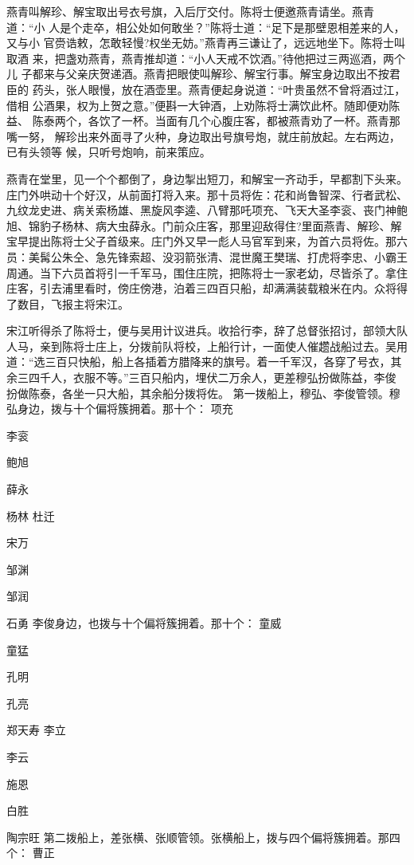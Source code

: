 燕青叫解珍、解宝取出号衣号旗，入后厅交付。陈将士便邀燕青请坐。燕青道：“小
人是个走卒，相公处如何敢坐？”陈将士道：“足下是那壁恩相差来的人，又与小
官赍诰敕，怎敢轻慢?权坐无妨。”燕青再三谦让了，远远地坐下。陈将士叫取酒
来，把盏劝燕青，燕青推却道：“小人天戒不饮酒。”待他把过三两巡酒，两个儿
子都来与父亲庆贺递酒。燕青把眼使叫解珍、解宝行事。解宝身边取出不按君臣的
药头，张人眼慢，放在酒壶里。燕青便起身说道：“叶贵虽然不曾将酒过江，借相
公酒果，权为上贺之意。”便斟一大钟酒，上劝陈将士满饮此杯。随即便劝陈益、
陈泰两个，各饮了一杯。当面有几个心腹庄客，都被燕青劝了一杯。燕青那嘴一努，
解珍出来外面寻了火种，身边取出号旗号炮，就庄前放起。左右两边，已有头领等
候，只听号炮响，前来策应。

燕青在堂里，见一个个都倒了，身边掣出短刀，和解宝一齐动手，早都割下头来。
庄门外哄动十个好汉，从前面打将入来。那十员将佐：花和尚鲁智深、行者武松、
九纹龙史进、病关索杨雄、黑旋风李逵、八臂那吒项充、飞天大圣李衮、丧门神鲍
旭、锦豹子杨林、病大虫薛永。门前众庄客，那里迎敌得住?里面燕青、解珍、解
宝早提出陈将士父子首级来。庄门外又早一彪人马官军到来，为首六员将佐。那六
员：美髯公朱仝、急先锋索超、没羽箭张清、混世魔王樊瑞、打虎将李忠、小霸王
周通。当下六员首将引一千军马，围住庄院，把陈将士一家老幼，尽皆杀了。拿住
庄客，引去浦里看时，傍庄傍港，泊着三四百只船，却满满装载粮米在内。众将得
了数目，飞报主将宋江。

宋江听得杀了陈将士，便与吴用计议进兵。收拾行李，辞了总督张招讨，部领大队
人马，亲到陈将士庄上，分拨前队将校，上船行计，一面使人催趱战船过去。吴用
道：“选三百只快船，船上各插着方腊降来的旗号。着一千军汉，各穿了号衣，其
余三四千人，衣服不等。”三百只船内，埋伏二万余人，更差穆弘扮做陈益，李俊
扮做陈泰，各坐一只大船，其余船分拨将佐。
第一拨船上，穆弘、李俊管领。穆弘身边，拨与十个偏将簇拥着。那十个：
项充

李衮

鲍旭

薛永

杨林
杜迁

宋万

邹渊

邹润

石勇
李俊身边，也拨与十个偏将簇拥着。那十个：
童威

童猛

孔明

孔亮

郑天寿
李立

李云

施恩

白胜

陶宗旺
第二拨船上，差张横、张顺管领。张横船上，拨与四个偏将簇拥着。那四个：
曹正

